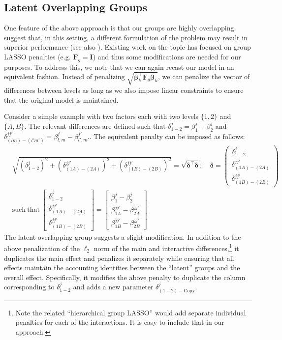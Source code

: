 \subsection{Latent Overlapping Groups}
\label{sec:app_log}

One feature of the above approach is that our groups are highly
overlapping. \cite{yan2017hierarchical} suggest that, in this setting,
a different formulation of the problem may result in superior
performance (see also \citealt{lim2015learning}). Existing work on the
topic has focused on group LASSO penalties (e.g. $\bm{F}_g = \bm{I}$)
and thus some modifications are needed for our purposes. To address
this, we note that we can again recast our model in an equivalent
fashion.  Instead of penalizing
$\sqrt{\bm{\beta}_k^\top\bm{F}_g \bm{\beta}_k}$, we can penalize the
vector of differences between levels as long as we also impose linear
constraints to ensure that the original model is maintained.

Consider a simple example with two factors each with two levels
$\{1,2\}$ and $\{A,B\}$.  The relevant differences are defined such
that $\delta^j_{1-2} = \beta^j_{1} - \beta^j_2$ and
$\delta^{jj'}_{(lm) - (l'm')} = \beta^j_{l,m} -
\beta^{j'}_{l',m'}$. The equivalent penalty can be imposed as follows:
\begin{equation}
\begin{split}
&\sqrt{\left(\delta^j_{1-2}\right)^2 + \left(\delta^{jj'}_{(1A) - (2A)}\right)^2 + \left(\delta^{jj'}_{(1B)-(2B)}\right)^2} = \sqrt{\bm{\delta}^\top \bm{\delta}}; \quad \bm{\delta} = \left(\begin{array}{c} \delta^j_{1-2} \\ \delta^{jj'}_{(1A)-(2A)} \\ \delta^{jj'}_{(1B)-(2B)} \end{array}\right) \\
&\mathrm{such~that}~\left[\begin{array}{l} \delta^j_{1-2} \\ \delta^{jj'}_{(1A)-(2A)} \\ \delta^{jj'}_{(1B)-(2B)} \end{array}\right] = \left[\begin{array}{lll} \beta^j_1 - \beta^j_2 \\ \beta^{jj'}_{1A} - \beta^{jj'}_{2A} \\ \beta^{jj'}_{1B} - \beta^{jj'}_{2B} \end{array}\right]
\end{split}
\end{equation} 
The latent overlapping group suggests a slight modification.  In
addition to the above penalization of the $\ell_2$ norm of the main
and interactive differences,\footnote{Note the related ``hierarchical
  group LASSO'' would add separate individual penalties for each of
  the interactions. It is easy to include that in our approach.} it
duplicates the main effect and penalizes it separately while ensuring
that all effects maintain the accounting identities between the
``latent'' groups and the overall effect. Specifically, it modifies
the above penalty to duplicate the column corresponding to
$\delta^j_{1-2}$ and adds a new parameter
$\delta^j_{(1-2)-\mathrm{Copy}}$.

